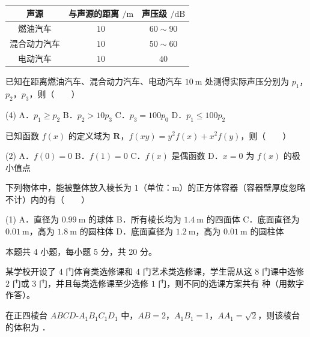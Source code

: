 \begin{center}
\begin{tabular}{ccc}
\toprule
声源 & 与声源的距离 $/\mathrm m$ & 声压级 $/\mathrm{dB}$ \\
\midrule
燃油汽车 & $10$ & $60\sim90$ \\
混合动力汽车 & $10$ & $50\sim60$ \\
电动汽车 & $10$ & $40$ \\
\bottomrule
\end{tabular}
\end{center}

已知在距离燃油汽车、混合动力汽车、电动汽车 $10\ \mathrm m$ 处测得实际声压分别为 $p_1$，$p_2$，$p_3$，则（　　）

\begin{gkopts}(4)
\task A．$p_1\ge p_2$
\task B．$p_2>10p_3$
\task C．$p_3=100p_0$
\task D．$p_1\le100p_2$
\end{gkopts}

已知函数 $f(x)$ 的定义域为 $\mathbf R$，$f(xy)=y^{2}f(x)+x^{2}f(y)$，则（　　）

\begin{gkopts}(2)
\task A．$f(0)=0$
\task B．$f(1)=0$
\task C．$f(x)$ 是偶函数
\task D．$x=0$ 为 $f(x)$ 的极小值点
\end{gkopts}

下列物体中，能被整体放入棱长为 $1$（单位：$\mathrm m$）的正方体容器（容器壁厚度忽略不计）内的有（　　）

\begin{gkopts}(1)
\task A．直径为 $0.99\ \mathrm m$ 的球体
\task B．所有棱长均为 $1.4\ \mathrm m$ 的四面体
\task C．底面直径为 $0.01\ \mathrm m$，高为 $1.8\ \mathrm m$ 的圆柱体
\task D．底面直径为 $1.2\ \mathrm m$，高为 $0.01\ \mathrm m$ 的圆柱体
\end{gkopts}

\par\medskip


\begin{gktip}
本题共 4 小题，每小题 5 分，共 20 分。
\end{gktip}

某学校开设了 $4$ 门体育类选修课和 $4$ 门艺术类选修课，学生需从这 $8$ 门课中选修 $2$ 门或 $3$ 门，并且每类选修课至少选修 $1$ 门，则不同的选课方案共有 \gkblank{} 种（用数字作答）。

在正四棱台 $ABCD\text{-}A_1B_1C_1D_1$ 中，$AB=2$，$A_1B_1=1$，$AA_1=\sqrt2$，则该棱台的体积为 \gkblank{}．

